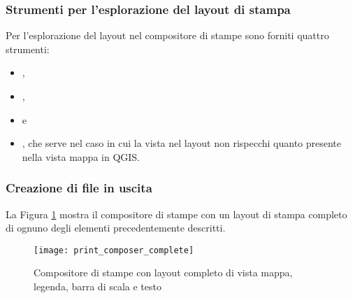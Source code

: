 
\subsubsection{Strumenti per l'esplorazione del layout di stampa}

Per l'esplorazione del layout nel compositore di stampe sono forniti quattro
strumenti:

\begin{itemize}
\item {},
\item {},
\item {} e
\item {}, che serve nel caso in cui
la vista nel layout non rispecchi quanto presente nella vista mappa in QGIS. 
\end{itemize}

\subsubsection{Creazione di file in uscita}

La Figura \ref{fig:print_composer_complete} mostra il compositore di stampe
con un layout di stampa completo di ognuno degli elementi precedentemente
descritti.

\begin{figure}[h]
   \begin{center}
   \caption{Compositore di stampe con layout completo di vista mappa, legenda,
   barra di scala e testo \nixcaption}
   \label{fig:print_composer_complete}\smallskip
   \texttt{[image: print\_composer\_complete]}
\end{center}  
\end{figure}

